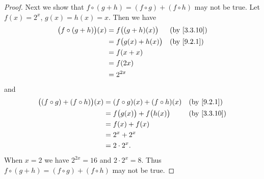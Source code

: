 \begin{proof}
  Next we show that \(f \circ (g + h) = (f \circ g) + (f \circ h)\) may not be true.
  Let \(f(x) = 2^x\), \(g(x) = h(x) = x\).
  Then we have
  \begin{align*}
    \big(f \circ (g + h)\big)(x) & = f\big((g + h)(x)\big)  &  & \by{3.3.10} \\
                                 & = f\big(g(x) + h(x)\big) &  & \by{9.2.1}  \\
                                 & = f(x + x)                                \\
                                 & = f(2x)                                   \\
                                 & = 2^{2x}
  \end{align*}
  and
  \begin{align*}
    \big((f \circ g) + (f \circ h)\big)(x) & = (f \circ g)(x) + (f \circ h)(x)   &  & \by{9.2.1}  \\
                                           & = f\big(g(x)\big) + f\big(h(x)\big) &  & \by{3.3.10} \\
                                           & = f(x) + f(x)                                        \\
                                           & = 2^x + 2^x                                          \\
                                           & = 2 \cdot 2^x.
  \end{align*}
  When \(x = 2\) we have \(2^{2x} = 16\) and \(2 \cdot 2^x = 8\).
  Thus \(f \circ (g + h) = (f \circ g) + (f \circ h)\) may not be true.


\end{proof}
